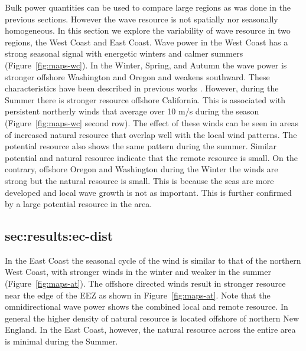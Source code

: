 Bulk power quantities can be used to compare large regions as was done in the previous sections. However the wave resource is not spatially nor seasonally homogeneous. In this section we explore the variability of wave resource in two regions, the West Coast and East Coast. Wave power in the West Coast has a strong seasonal signal with energetic winters and calmer summers (Figure~\ref{fig:maps-wc}). In the Winter, Spring, and Autumn the wave power is stronger offshore Washington and Oregon and weakens southward. These characteristics have been described in previous works \citep[e.g.][]{garcia-medinaWaveResourceAssessment2014,lenee-bluhm_characterizing_2011,yangCharacteristicsVariabilityNearshore2020}. However, during the Summer there is stronger resource offshore California. This is associated with persistent northerly winds that average over 10 m/s during the season (Figure~\ref{fig:maps-wc} second row). The effect of these winds can be seen in areas of increased natural resource that overlap well with the local wind patterns. The potential resource also shows the same pattern during the summer. Similar potential and natural resource indicate that the remote resource is small. On the contrary, offshore Oregon and Washington during the Winter the winds are strong but the natural resource is small. This is because the seas are more developed and local wave growth is not as important. This is further confirmed by a large potential resource in the area. 


\subsection{sec:results:ec-dist}
In the East Coast the seasonal cycle of the wind is similar to that of the northern West Coast, with stronger winds in the winter and weaker in the summer (Figure~\ref{fig:maps-at}). The offshore directed winds result in stronger resource near the edge of the EEZ as shown in Figure~\ref{fig:maps-at}. Note that the omnidirectional wave power shows the combined local and remote resource. In general the higher density of natural resource is located offshore of northern New England. In the East Coast, however, the natural resource across the entire area is minimal during the Summer.

